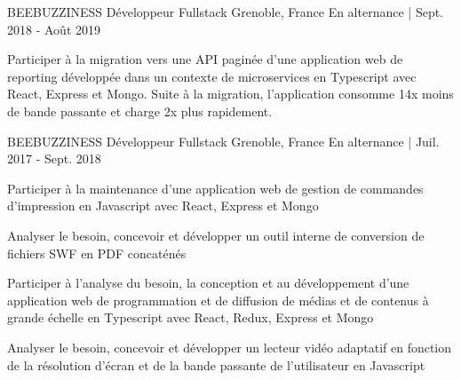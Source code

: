 

\begin{cventries}

  \cventry
  	{BEEBUZZINESS} %
    {Développeur Fullstack} %
    {Grenoble, France} %
    {En alternance | Sept. 2018 - Août 2019} %
    {
      \begin{cvitems} %
        \item {Participer à la migration vers une API paginée d'une application web de reporting développée dans un contexte de microservices en Typescript avec React, Express et Mongo.
        Suite à la migration, l'application consomme 14x moins de bande passante et charge 2x plus rapidement.}
      \end{cvitems}
    }

  \cventry
  	{BEEBUZZINESS} %
    {Développeur Fullstack} %
    {Grenoble, France} %
    {En alternance | Juil. 2017 - Sept. 2018} %
    {
      \begin{cvitems} %
        \item {Participer à la maintenance d’une application web de gestion de commandes d'impression en Javascript avec React, Express et Mongo}
        \item {Analyser le besoin, concevoir et développer un outil interne de conversion de fichiers SWF en PDF concaténés}
        \item {Participer à l’analyse du besoin, la conception et au développement d’une application web de programmation et de diffusion de médias et de contenus à grande échelle en Typescript avec React, Redux, Express et Mongo}
        \item {Analyser le besoin, concevoir et développer un lecteur vidéo adaptatif en fonction de la résolution d'écran et de la bande passante de l'utilisateur en Javascript}
      \end{cvitems}
    }


\end{cventries}
